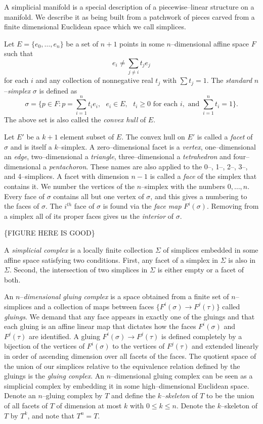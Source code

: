 A simplicial manifold is a special description of a piecewise--linear structure on a manifold.
We describe it as being built from a patchwork of pieces carved from a finite dimensional Euclidean space which we call simplices.

Let $E=\{e_0,\dots,e_n\}$ be a set of $n+1$ points in some $n$--dimensional affine space $F$ such that
\[
  e_i\neq \sum_{j\neq i}t_j e_j
\]
for each $i$ and any collection of nonnegative real $t_j$ with $\sum t_j=1$.
The \emph{standard} $n$--\emph{simplex} $\sigma$ is defined as
\[
  \sigma = \{p\in F : p = \sum_{i=1}^n t_i e_i,\text{ } e_i\in E,\text{ } t_i\geq 0\text{ for each }i, \text{ and }\sum_{i=1}^n t_i=1\}.
\]
The above set is also called the \emph{convex hull} of $E$.

Let $E'$ be a $k+1$ element subset of $E$.
The convex hull on $E'$ is called a \emph{facet} of $\sigma$ and is itself a $k$--simplex.
A zero--dimensional facet is a \emph{vertex}, one--dimensional an \emph{edge}, two--dimensional a \emph{triangle}, three--dimensional a \emph{tetrahedron} and four--dimensional a \emph{pentachoron}.
These names are also applied to the 0--, 1--, 2--, 3--, and 4--simplices.
A facet with dimension $n-1$ is called a \emph{face} of the simplex that contains it.
We number the vertices of the $n$--simplex with the numbers $0,\dots,n$.
Every face of $\sigma$ contains all but one vertex of $\sigma$, and this gives a numbering to the faces of $\sigma$.
The $i^{th}$ face of $\sigma$ is found via the \emph{face map} $F^i(\sigma)$.
Removing from a simplex all of its proper faces gives us the \emph{interior} of $\sigma$.

\{FIGURE HERE IS GOOD\}

A \emph{simplicial complex} is a locally finite collection $\Sigma$ of simplices embedded in some affine space satisfying two conditions.
First, any facet of a simplex in $\Sigma$ is also in $\Sigma$.
Second, the intersection of two simplices in $\Sigma$ is either empty or a facet of both.

An $n$--\emph{dimensional gluing complex} is a space obtained from a finite set of $n$--simplices and a collection of maps between faces $\{F^i(\sigma)\to F^j(\tau)\}$ called \emph{gluings}.
We demand that any face appears in exactly one of the gluings and that each gluing is an affine linear map that dictates how the faces $F^i(\sigma)$ and $F^j(\tau)$ are identified.
A gluing $F^i(\sigma)\to F^j(\tau)$ is defined completely by a bijection of the vertices of $F^i(\sigma)$ to the vertices of $F^j(\tau)$ and extended linearly in order of ascending dimension over all facets of the faces.
The quotient space of the union of our simplices relative to the equivalence relation defined by the gluings is the \emph{gluing conplex}.
An $n$--dimensional gluing complex can be seen as a simplicial complex by embedding it in some high--dimensional Euclidean space.
Denote an $n$--gluing complex by $T$ and define the \emph{$k$--skeleton} of $T$ to be the union of all facets of $T$ of dimension at most $k$ with $0\leq k\leq n$.
Denote the $k$--skeleton of $T$ by $T^k$, and note that $T^n=T$.




